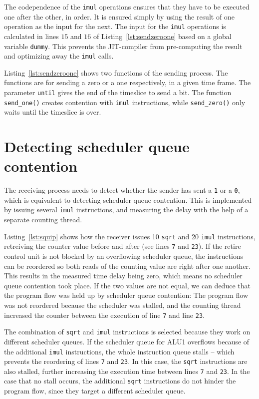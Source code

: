 \documentclass[11pt,
  titlepage=false,
  parskip=half,      %
]{scrreprt}
\begin{document}
The codependence of the \texttt{imul} operations ensures that they have to be executed one after the other, in order.
It is ensured simply by using the result of one operation as the input for the next.
The input for the \texttt{imul} operations is calculated in lines $15$ and $16$ of Listing~\ref{lst:sendzeroone} based on a global variable \texttt{dummy}.
This prevents the JIT-compiler from pre-computing the result and optimizing away the \texttt{imul} calls.

Listing~\ref{lst:sendzeroone} shows two functions of the sending process.
The functions are for sending a zero or a one respectively, in a given time frame.
The parameter \texttt{until} gives the end of the timeslice to send a bit.
The function \texttt{send\_one()} creates contention with \texttt{imul} instructions,
while \texttt{send\_zero()} only waits until the timeslice is over.

\section{Detecting scheduler queue contention}
\label{sec:detect-sqc}
The receiving process needs to detect whether the sender has sent a \texttt{1} or a \texttt{0},
which is equivalent to detecting scheduler queue contention.
This is implemented by issuing several \texttt{imul} instructions,
and measuring the delay with the help of a separate counting thread.

Listing~\ref{lst:squip} shows how the receiver issues 10 \texttt{sqrt} and 20 \texttt{imul} instructions,
retreiving the counter value before and after (see lines \texttt{7} and \texttt{23}).
If the retire control unit is not blocked by an overflowing scheduler queue,
the instructions can be reordered so both reads of the counting value are right after one another.
This results in the measured time delay being zero, which means no scheduler queue contention took place.
If the two values are not equal, we can deduce that the program flow was held up by scheduler queue contention:
The program flow was not reordered because the scheduler was stalled, and the counting thread increased the counter
between the execution of line \texttt{7} and line \texttt{23}.

The combination of \texttt{sqrt} and \texttt{imul} instructions is selected because they work on different scheduler queues.
If the scheduler queue for ALU1 overflows because of the additional \texttt{imul} instructions,
the whole instruction queue stalls -- which prevents the reordering of lines \texttt{7} and \texttt{23}.
In this case, the \texttt{sqrt} instructions are also stalled, further increasing the execution time between lines \texttt{7} and \texttt{23}.
In the case that no stall occurs, the additional \texttt{sqrt} instructions do not hinder the program flow,
since they target a different scheduler queue.
\end{document}
